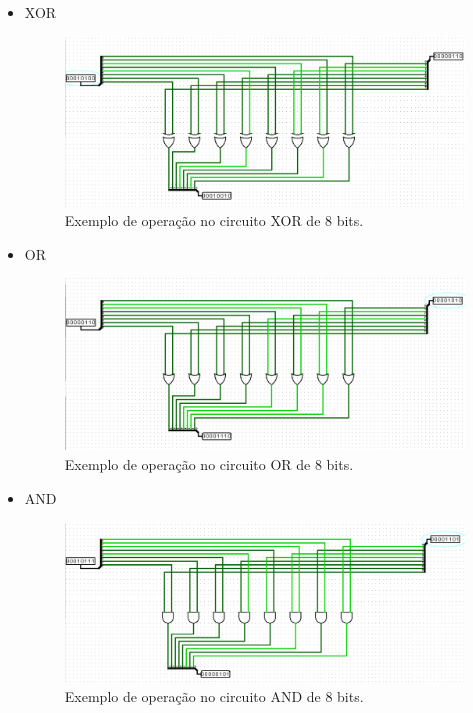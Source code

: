 \documentclass[
	12pt,				%
	openright,			%
	twoside,			%
	a4paper,			%
	english,			%
	french,				%
	spanish,			%
	brazil,				%
	]{abntex2}
\begin{document}
\begin{apendicesenv}
\begin{itemize}
\item {XOR}

\begin{figure}[H]
	\begin{center}
	    \includegraphics[scale=0.4]{imagens/xor8bteste.png}
	\end{center}
\caption{\label{xorteste}Exemplo de operação no circuito XOR de 8 bits.}
\end{figure}

\item {OR}

\begin{figure}[H]
	\begin{center}
	    \includegraphics[scale=0.4]{imagens/or8bteste.png}
	\end{center}
\caption{\label{orteste}Exemplo de operação no circuito OR de 8 bits.}
\end{figure}

\item {AND}

\begin{figure}[H]
	\begin{center}
	    \includegraphics[scale=0.4]{imagens/and8bteste.png}
	\end{center}
\caption{\label{andteste}Exemplo de operação no circuito AND de 8 bits.}
\end{figure}


\end{itemize}
\end{apendicesenv}
\end{document}
